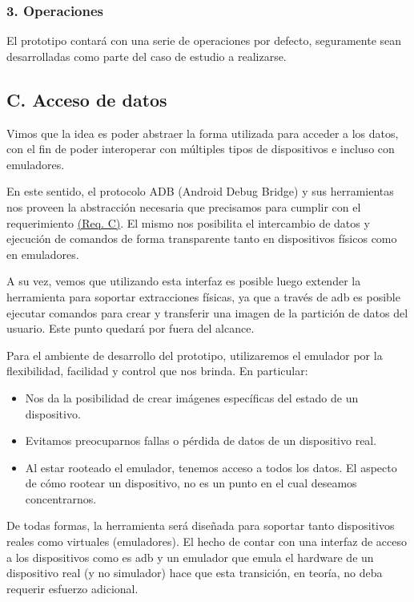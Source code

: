 \subsubsection*{3. Operaciones}
El prototipo contará con una serie de operaciones por defecto, seguramente sean desarrolladas como parte del caso de estudio a realizarse.

\subsection*{C. Acceso de datos}
Vimos que la idea es poder abstraer la forma utilizada para acceder a los datos, con el fin de poder interoperar con múltiples tipos de dispositivos e incluso con emuladores.

En este sentido, el protocolo ADB (Android Debug Bridge) y sus herramientas nos proveen la abstracción necesaria que precisamos para cumplir con el requerimiento \hyperref[reqC]{(Req. C)}. El mismo nos posibilita el intercambio de datos y ejecución de comandos de forma transparente tanto en dispositivos físicos como en emuladores.

A su vez, vemos que utilizando esta interfaz es posible luego extender la herramienta para soportar extracciones físicas, ya que a través de adb es posible ejecutar comandos para crear y transferir una imagen de la partición de datos del usuario. Este punto quedará por fuera del alcance.

Para el ambiente de desarrollo del prototipo, utilizaremos el emulador por la flexibilidad, facilidad y control que nos brinda. En particular:

\begin{itemize}
\item Nos da la posibilidad de crear imágenes específicas del estado de un dispositivo.
\item Evitamos preocuparnos fallas o pérdida de datos de un dispositivo real.
\item Al estar rooteado el emulador, tenemos acceso a todos los datos. El aspecto de cómo rootear un dispositivo, no es un punto en el cual deseamos concentrarnos.
\end{itemize}

De todas formas, la herramienta será diseñada para soportar tanto dispositivos reales como virtuales (emuladores). El hecho de contar con una interfaz de acceso a los dispositivos como es adb y un emulador que emula el hardware de un dispositivo real (y no simulador) hace que esta transición, en teoría, no deba requerir esfuerzo adicional.

